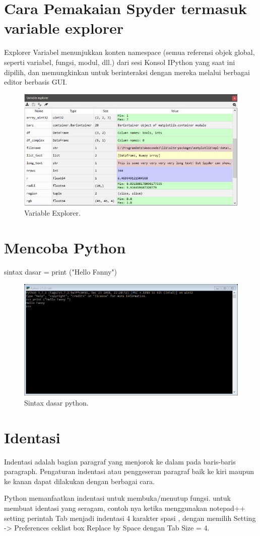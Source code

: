 \documentclass[lipt]{Article}
\begin{document}
\section{Cara Pemakaian Spyder termasuk variable explorer}

Explorer Variabel menunjukkan konten namespace (semua referensi objek global, seperti variabel, fungsi, modul, dll.) dari sesi Konsol IPython yang saat ini dipilih, dan memungkinkan untuk berinteraksi dengan mereka melalui berbagai editor berbasis GUI.

\begin{figure}[htbp]
\centerline{\includegraphics{chapters/gambar/5.png}}
\caption{Variable Explorer.}
\label{fig}
\end{figure}

\section{Mencoba Python}
sintax dasar = print ("Hello Fanny")

\begin{figure}[htbp]
\centerline{\includegraphics{chapters/gambar/6.png}}
\caption{Sintax dasar python.}
\label{fig}
\end{figure}

\section{Identasi}
Indentasi adalah bagian paragraf yang menjorok ke dalam pada baris-baris paragraph. Pengaturan indentasi atau penggeseran paragraf baik ke kiri maupun ke kanan dapat dilakukan dengan berbagai cara. 

Python memanfaatkan indentasi untuk membuka/menutup fungsi. untuk membuat identasi yang seragam, contoh nya ketika menggunakan notepad++ setting perintah Tab menjadi indentasi 4 karakter spasi , dengan memilih Setting -> Preferences ceklist box Replace by Space dengan Tab Size = 4.
\end{document}
